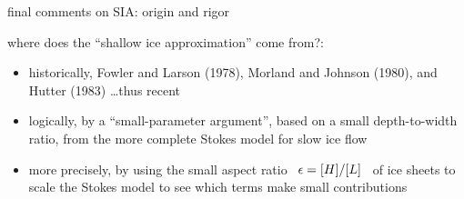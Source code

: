 \begin{frame}{final comments on SIA: origin and rigor}

where does the ``shallow ice approximation'' come from?:
\bigskip

\begin{itemize}
\item historically, Fowler and Larson (1978), Morland and Johnson (1980), and Hutter (1983) \dots thus recent
\item logically, by a ``small-parameter argument'', based on a small depth-to-width ratio, from the more complete Stokes model for slow ice flow
\item more precisely, by using the small aspect ratio \, $\epsilon = [H]/[L]$ \, of ice sheets to scale the Stokes model to see which terms make small contributions
\end{itemize}
\end{frame}